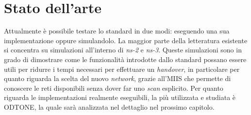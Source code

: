 \section{Stato dell'arte}
Attualmente è possibile testare lo standard in due modi: eseguendo una sua implementazione oppure simulandolo. La maggior parte della letteratura esistente si concentra su simulazioni all'interno di {\em ns-2}\cite{ns2} e {\em ns-3}\cite{ns3}. Queste simulazioni sono in grado di dimostrare come le funzionalità introdotte dallo standard possano essere utili per ridurre i tempi necessari per effettuare un {\em handover}\cite{master}, in particolare per quanto riguarda la scelta del nuovo {\em network}, grazie all'MIIS che permette di conoscere le reti disponibili senza dover far uno {\em scan} esplicito. Per quanto riguarda le implementazioni realmente eseguibili, la più utilizzata e studiata è ODTONE\cite{odtone}, la quale sarà analizzata nel dettaglio nel prossimo capitolo.